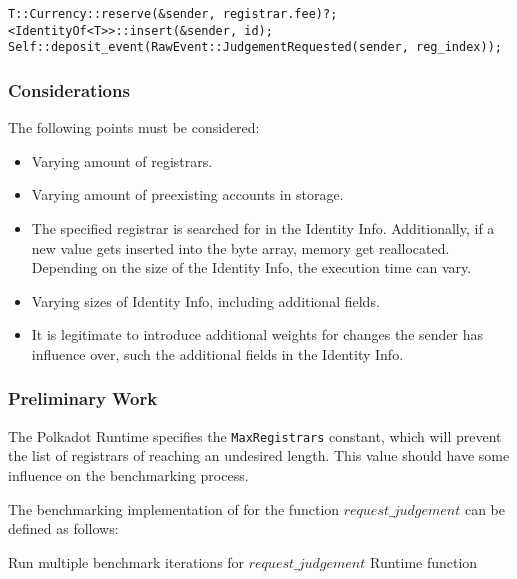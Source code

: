 \documentclass[11pt,a4paper]{article}
\begin{document}
\begin{verbatim}
T::Currency::reserve(&sender, registrar.fee)?;
<IdentityOf<T>>::insert(&sender, id);
Self::deposit_event(RawEvent::JudgementRequested(sender, reg_index));
\end{verbatim}

\subsubsection{Considerations}

The following points must be considered:

\begin{itemize}
  \item Varying amount of registrars.
  \item Varying amount of preexisting accounts in storage.
  \item The specified registrar is searched for in the Identity Info.
  Additionally, if a new value gets inserted into the byte array, memory get
  reallocated. Depending on the size of the Identity Info, the execution time
  can vary.
  \item Varying sizes of Identity Info, including additional fields.
  \item It is legitimate to introduce additional weights for changes the sender
  has influence over, such the additional fields in the Identity Info.
\end{itemize}

\subsubsection{Preliminary Work}

The Polkadot Runtime specifies the \verb|MaxRegistrars| constant, which will
prevent the list of registrars of reaching an undesired length. This value
should have some influence on the benchmarking process.
\newline

The benchmarking implementation of for the function $request\_judgement$ can be
defined as follows:

\begin{algorithm}[H]
  \caption{Run multiple benchmark iterations for $request\_judgement$ Runtime function}
  \SetAlgoLined
  \BlankLine
\end{algorithm}
\end{document}
